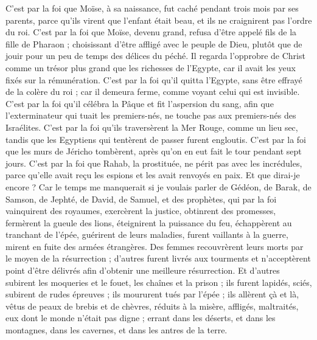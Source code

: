 \begin{multicols}{2}
C’est par la foi que Moïse, à sa naissance, fut caché pendant trois mois par ses parents, parce qu’ils virent que l’enfant était beau, et ils ne craignirent pas l’ordre du roi.
C’est par la foi que Moïse, devenu grand, refusa d'être appelé fils de la fille de Pharaon ;
choisissant d’être affligé avec le peuple de Dieu, plutôt que de jouir pour un peu de temps des délices du péché.
Il regarda l'opprobre de Christ comme un trésor plus grand que les richesses de l'Egypte, car il avait les yeux fixés sur la rémunération.
C’est par la foi qu’il quitta l'Egypte, sans être effrayé de la colère du roi ; car il demeura ferme, comme voyant celui qui est invisible.
C’est par la foi qu’il célébra la Pâque et fit l'aspersion du sang, afin que l’exterminateur qui tuait les premiers-nés, ne touche pas aux premiers-nés des Israélites.
C’est par la foi qu’ils traversèrent la Mer Rouge, comme un lieu sec, tandis que les Egyptiens qui tentèrent de passer furent engloutis.
C’est par la foi que les murs de Jéricho tombèrent, après qu'on en eut fait le tour pendant sept jours.
C’est par la foi que Rahab, la prostituée, ne périt pas avec les incrédules, parce qu’elle avait reçu les espions et les avait renvoyés en paix.
Et que dirai-je encore ? Car le temps me manquerait si je voulais parler de Gédéon, de Barak, de Samson, de Jephté, de David, de Samuel, et des prophètes,
qui par la foi vainquirent des royaumes, exercèrent la justice, obtinrent des promesses, fermèrent la gueule des lions,
éteignirent la puissance du feu, échappèrent au tranchant de l’épée, guérirent de leurs maladies, furent vaillants à la guerre, mirent en fuite des armées étrangères.
Des femmes recouvrèrent leurs morts par le moyen de la résurrection ; d'autres furent livrés aux tourments et n’acceptèrent point d'être délivrés afin d'obtenir une meilleure résurrection.
Et d'autres subirent les moqueries et le fouet, les chaînes et la prison ;
ils furent lapidés, sciés, subirent de rudes épreuves ; ils moururent tués par l'épée ; ils allèrent çà et là, vêtus de peaux de brebis et de chèvres, réduits à la misère, affligés, maltraités,
eux dont le monde n'était pas digne ; errant dans les déserts, et dans les montagnes, dans les cavernes, et dans les antres de la terre.

\end{multicols}
